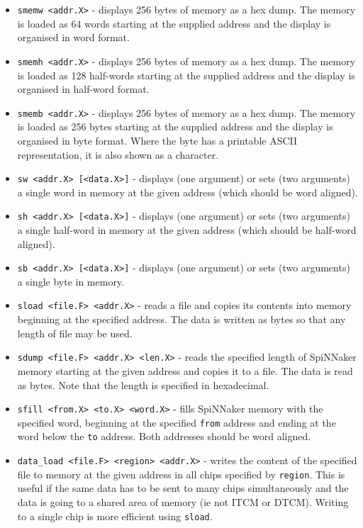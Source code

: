 \begin{itemize}

\item
\texttt{smemw <addr.X>} - displays 256 bytes of memory as a hex dump.
The memory is loaded as 64 words starting at the supplied address and
the display is organised in word format.

\item
\texttt{smemh <addr.X>} - displays 256 bytes of memory as a hex dump.
The memory is loaded as 128 half-words starting at the supplied
address and the display is organised in half-word format.

\item
\texttt{smemb <addr.X>} - displays 256 bytes of memory as a hex dump.
The memory is loaded as 256 bytes starting at the supplied address and
the display is organised in byte format. Where the byte has a
printable ASCII representation, it is also shown as a character.

\item
\texttt{sw <addr.X> [<data.X>]} - displays (one argument) or sets (two
arguments) a single word in memory at the given address (which should
be word aligned).

\item
\texttt{sh <addr.X> [<data.X>]} - displays (one argument) or sets (two
arguments) a single half-word in memory at the given address (which
should be half-word aligned).

\item
\texttt{sb <addr.X> [<data.X>]} - displays (one argument) or sets (two
arguments) a single byte in memory.

\item
\texttt{sload <file.F> <addr.X>} - reads a file and copies its
contents into memory beginning at the specified address. The data is
written as bytes so that any length of file may be used.

\item
\texttt{sdump <file.F> <addr.X> <len.X>} - reads the specified length of
SpiNNaker memory starting at the given address and copies it to a
file. The data is read as bytes. Note that the length is specified in
hexadecimal.

\item
\texttt{sfill <from.X> <to.X> <word.X>} - fills SpiNNaker memory with
the specified word, beginning at the specified \texttt{from} address
and ending at the word below the \texttt{to} address. Both addresses
should be word aligned.

\item
\texttt{data\_load <file.F> <region> <addr.X>} - writes the content of
the specified file to memory at the given address in all chips
specified by \texttt{region}. This is useful if the same data has to
be sent to many chips simultaneously and the data is going to a shared
area of memory (ie not ITCM or DTCM). Writing to a single chip is more
efficient using \texttt{sload}.

\end{itemize}

